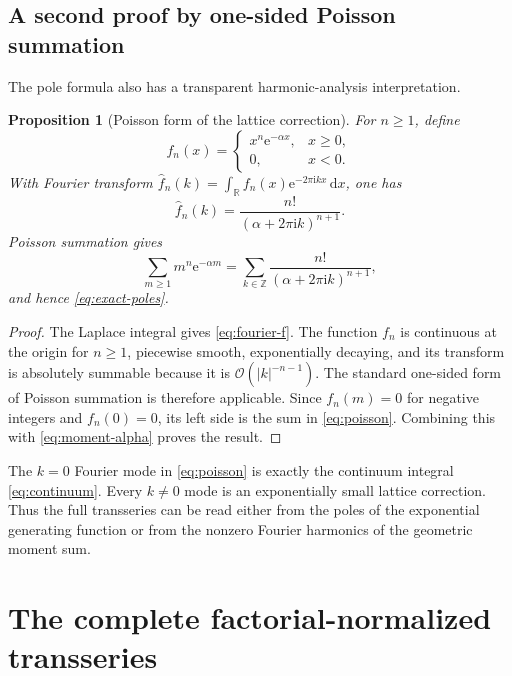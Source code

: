 \documentclass[11pt,a4paper]{article}
\newtheorem{proposition}[theorem]{Proposition}
\theoremstyle{definition}
\theoremstyle{remark}
\newcommand{\e}{\mathrm e}
\newcommand{\ii}{\mathrm i}
\newcommand{\dd}{\,\mathrm d}
\newcommand{\cO}{\mathcal O}
\newcommand{\abs}[1]{\left|#1\right|}
\newcommand{\Z}{\mathbb Z}
\newcommand{\R}{\mathbb R}
\begin{document}
\subsection{A second proof by one-sided Poisson summation}

The pole formula also has a transparent harmonic-analysis interpretation.

\begin{proposition}[Poisson form of the lattice correction]\label{prop:poisson}
For \(n\ge1\), define
\[
 f_n(x)=\begin{cases}
 x^n\e^{-\alpha x},&x\ge0,\\
 0,&x<0.
 \end{cases}
\]
With Fourier transform
\(
 \widehat f_n(k)=\int_{\R}f_n(x)\e^{-2\pi\ii kx}\dd x
\), one has
\begin{equation}\label{eq:fourier-f}
 \widehat f_n(k)=\frac{n!}{(\alpha+2\pi\ii k)^{n+1}}.
\end{equation}
Poisson summation gives
\begin{equation}\label{eq:poisson}
 \sum_{m\ge1}m^n\e^{-\alpha m}
 =\sum_{k\in\Z}\frac{n!}{(\alpha+2\pi\ii k)^{n+1}},
\end{equation}
and hence \eqref{eq:exact-poles}.
\end{proposition}

\begin{proof}
The Laplace integral gives \eqref{eq:fourier-f}.  The function \(f_n\) is
continuous at the origin for \(n\ge1\), piecewise smooth, exponentially
decaying, and its transform is absolutely summable because it is
\(\cO(\abs{k}^{-n-1})\).  The standard one-sided form of Poisson summation is
therefore applicable.  Since \(f_n(m)=0\) for negative integers and
\(f_n(0)=0\), its left side is the sum in \eqref{eq:poisson}.  Combining this
with \eqref{eq:moment-alpha} proves the result.
\end{proof}

\begin{insightbox}
The \(k=0\) Fourier mode in \eqref{eq:poisson} is exactly the continuum integral
\eqref{eq:continuum}.  Every \(k\ne0\) mode is an exponentially small lattice
correction.  Thus the full transseries can be read either from the poles of the
exponential generating function or from the nonzero Fourier harmonics of the
geometric moment sum.
\end{insightbox}

\section{The complete factorial-normalized transseries}
\end{document}
